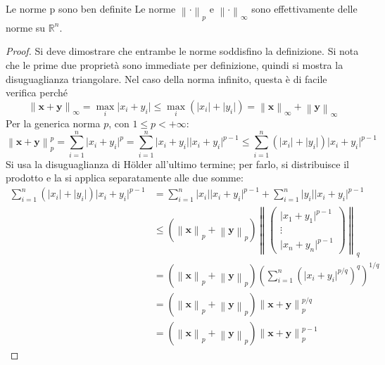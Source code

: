 \documentclass[11pt, a4paper]{scrartcl}
\theoremstyle{definition}
\numberwithin{esempio}{section}
\theoremstyle{definition}
\numberwithin{obs}{section}
\numberwithin{nota}{section}
\numberwithin{equation}{subsection}
\begin{document}
\begin{prop}
	{Le norme p sono ben definite}{}
	Le norme $\left\lVert \cdot  \right\rVert _p$ e $\left\lVert \cdot  \right\rVert _\infty$ sono effettivamente delle norme su $\mathbb{R}^n$.
	\begin{proof}
		Si deve dimostrare che entrambe le norme soddisfino la definizione.
		Si nota che le prime due propriet\`a sono immediate per definizione, quindi si mostra la disuguaglianza triangolare.
		Nel caso della norma infinito, questa \`e di facile verifica perch\'e
		\[
		\left\lVert \mathbf{x} + \mathbf{y}  \right\rVert _\infty = \max _i \lvert x_i +y _i \rvert \le  \max _i \left(\lvert x_i \rvert + \lvert y_i \rvert \right) = \left\lVert \mathbf{x}  \right\rVert _\infty + \left\lVert \mathbf{y}  \right\rVert _\infty
		\] 
		Per la generica norma $p$, con $1\le p< +\infty$:
		\[
		\left\lVert \mathbf{x} +\mathbf{y}  \right\rVert _p^p = \sum_{i=1}^{n} \lvert x_i + y_i \rvert ^p = \sum_{i=1}^{n} \lvert x_i + y_i \rvert \lvert x_i + y_i\rvert ^{p-1} \le \sum_{i=1}^{n} \left(\lvert x_i \rvert +\lvert y_i \rvert \right) \lvert x_i + y_i \rvert ^{p-1} 
		\] 
		Si usa la disuguaglianza di H\"older all'ultimo termine; per farlo, si distribuisce il prodotto e la si applica separatamente alle due somme:
		\[
		\begin{split}
			\sum_{i=1}^{n} \left(\lvert x_i \rvert + \lvert y_i \rvert \right) \lvert x_i+y_i \rvert^{p-1}  &= \sum_{i=1}^{n} \lvert x_i \rvert \lvert x_i+y_i \rvert ^{p-1} + \sum_{i=1}^{n} \lvert y_i \rvert \lvert x_i+y_i \rvert ^{p-1} \\
			&\le \left(\left\lVert \mathbf{x}  \right\rVert _p + \left\lVert \mathbf{y}  \right\rVert _p\right) \left\lVert \begin{pmatrix} \lvert x_1 + y_1 \rvert ^{p-1} \\ \vdots \\ \lvert x_n+y_n \rvert ^{p-1} \end{pmatrix}  \right\rVert _q\\
			&= \left(\left\lVert \mathbf{x}  \right\rVert _p + \left\lVert \mathbf{y}  \right\rVert _p\right)  \left(\sum_{i=1}^{n} \left(\lvert x_i+y_i \rvert^{p / q}    \right)^q \right) ^{1 / q} \\
			&=\left(\left\lVert \mathbf{x}  \right\rVert _p + \left\lVert \mathbf{y}  \right\rVert _p\right) \left\lVert \mathbf{x} +\mathbf{y}  \right\rVert ^{p / q} _p \\
			&=\left(\left\lVert \mathbf{x}  \right\rVert _p + \left\lVert \mathbf{y}  \right\rVert _p\right) \left\lVert \mathbf{x} + \mathbf{y}  \right\rVert _p^{p-1} 

\end{split}\]
\end{proof}
\end{prop}
\end{document}
